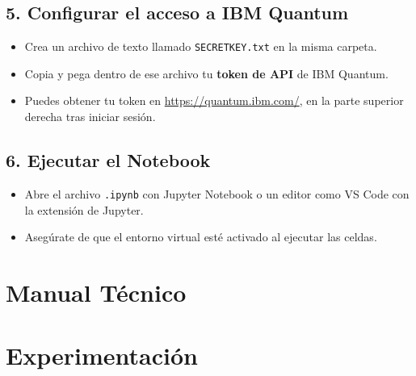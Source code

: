 \documentclass{article}
\begin{document}
\subsection*{5. Configurar el acceso a IBM Quantum}

\begin{itemize}
    \item Crea un archivo de texto llamado \texttt{SECRETKEY.txt} en la misma carpeta.
    \item Copia y pega dentro de ese archivo tu \textbf{token de API} de IBM Quantum.
    \item Puedes obtener tu token en \url{https://quantum.ibm.com/}, en la parte superior 
          derecha tras iniciar sesión.
\end{itemize}

\subsection*{6. Ejecutar el Notebook}

\begin{itemize}
    \item Abre el archivo \texttt{.ipynb} con Jupyter Notebook o un editor como VS Code con 
          la extensión de Jupyter.
    \item Asegúrate de que el entorno virtual esté activado al ejecutar las celdas.
\end{itemize}




\section{Manual Técnico}\label{sec:man_t}



\section{Experimentación}\label{sec:exp}
\end{document}
